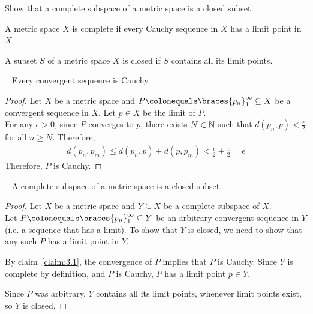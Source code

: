 \begin{problem}
  Show that a complete subspace of a metric space is a closed subset.
\end{problem}
\begin{answer}
  \begin{definition}
    A metric space $X$ is complete if every Cauchy sequence in $X$
    has a limit point in $X$.
  \end{definition}

  \begin{definition}
    A subset $S$ of a metric space $X$ is closed if $S$ contains all its limit points.
  \end{definition}

  \begin{claim}~\label{claim:3.1}
    Every convergent sequence is Cauchy.

    \begin{proof}
      Let $X$ be a metric space and $P \colonequals \braces{p_n}_1^\infty \subseteq X$ be a convergent sequence in $X$.
      Let $p \in X$ be the limit of $P$. \\
      For any $\epsilon > 0$, since $P$ converges to $p$,
      there exists $N \in \mathbb{N}$ such that
      $d(p_n, p) < \frac{\epsilon}{2}$ for all $n \geq N$.
      Therefore,
      \begin{align*}
        d(p_n, p_m) \leq d(p_n, p) + d(p, p_m) < \frac{\epsilon}{2} + \frac{\epsilon}{2} = \epsilon
      \end{align*}
      Therefore, $P$ is Cauchy.
    \end{proof}
  \end{claim}

  \begin{claim}~\label{claim:3.2}
    A complete subspace of a metric space is a closed subset.
    \begin{proof}
      Let $X$ be a metric space and $Y \subseteq X$ be a complete subspace of $X$.\\
      Let $P \colonequals \braces{p_n}_1^\infty \subseteq Y$ be an arbitrary
      convergent sequence in $Y$ (i.e. a sequence that has a limit).
      To show that $Y$ is closed, we need to show that any such $P$ has a limit point in $Y$.

      \step
      By claim~\ref{claim:3.1}, the convergence of $P$ implies that $P$ is Cauchy.
      Since $Y$ is complete by definition, and $P$ is Cauchy,
      $P$ has a limit point $p \in Y$.
      
      \step
      Since $P$ was arbitrary, $Y$ contains all its limit points,
      whenever limit points exist, so $Y$ is closed.
    \end{proof}
  \end{claim}
\end{answer}

